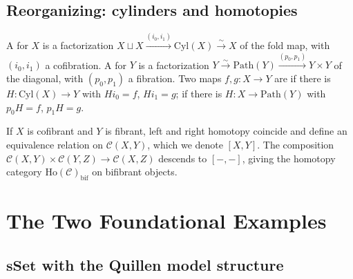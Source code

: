 \subsection{Reorganizing: cylinders and homotopies}

\begin{definition}
\label{def:cylinder-path}
A  for $X$ is a factorization $X \sqcup X
\xrightarrow{(i_0, i_1)} \mathrm{Cyl}(X) \xrightarrow{\sim} X$ of the
fold map, with $(i_0, i_1)$ a cofibration. A  for $Y$
is a factorization $Y \xrightarrow{\sim} \mathrm{Path}(Y) \xrightarrow{(p_0, p_1)}
Y \times Y$ of the diagonal, with $(p_0, p_1)$ a fibration.
Two maps $f, g : X \to Y$ are  if there is $H :
\mathrm{Cyl}(X) \to Y$ with $H i_0 = f$, $H i_1 = g$;  if there is $H : X \to \mathrm{Path}(Y)$ with $p_0 H = f$,
$p_1 H = g$.
\end{definition}

\begin{theorem}
\label{thm:homotopy-equiv}
If $X$ is cofibrant and $Y$ is fibrant, left and right homotopy coincide
and define an equivalence relation on $\mathcal{C}(X, Y)$, which we denote
$[X, Y]$. The composition $\mathcal{C}(X, Y) \times \mathcal{C}(Y, Z) \to
\mathcal{C}(X, Z)$ descends to $[-,-]$, giving the homotopy category
$\mathrm{Ho}(\mathcal{C})_{\mathrm{bif}}$ on bifibrant objects.
\end{theorem}


\section{The Two Foundational Examples}
\label{sec:foundational-examples}

\subsection{$\mathbf{sSet}$ with the Quillen model structure}

